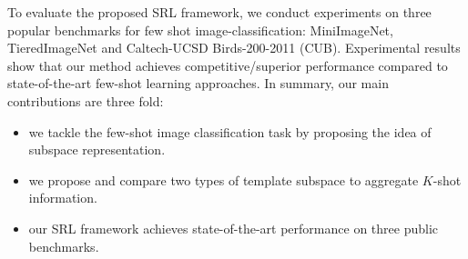To evaluate the proposed SRL framework, we conduct experiments on three popular benchmarks for few shot image-classification: MiniImageNet, TieredImageNet and Caltech-UCSD Birds-200-2011 (CUB).
Experimental results show that our method achieves competitive/superior performance compared to state-of-the-art few-shot learning approaches.
In summary, our main contributions are three fold:
\begin{itemize}
    \item we tackle the few-shot image classification task by proposing the idea of subspace representation. \\
    \vspace{-0.1in}
    \item we propose and compare two types of template subspace to aggregate $K$-shot information. \\
    \vspace{-0.1in}
    \item our SRL framework achieves state-of-the-art performance on three public benchmarks. \\
    \vspace{-0.1in}
\end{itemize}
